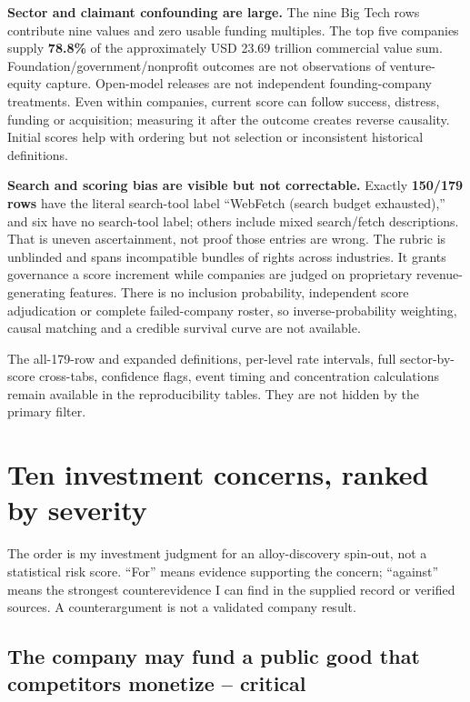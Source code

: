 \documentclass{article}
\begin{document}
\textbf{Sector and claimant confounding are large.} The nine Big Tech
rows contribute nine values and zero usable funding multiples. The top
five companies supply \textbf{78.8\%} of the approximately USD 23.69
trillion commercial value sum. Foundation/government/nonprofit outcomes
are not observations of venture-equity capture. Open-model releases are
not independent founding-company treatments. Even within companies,
current score can follow success, distress, funding or acquisition;
measuring it after the outcome creates reverse causality. Initial scores
help with ordering but not selection or inconsistent historical
definitions.

\textbf{Search and scoring bias are visible but not correctable.}
Exactly \textbf{150/179 rows} have the literal search-tool label
``WebFetch (search budget exhausted),'' and six have no search-tool
label; others include mixed search/fetch descriptions. That is uneven
ascertainment, not proof those entries are wrong. The rubric is
unblinded and spans incompatible bundles of rights across industries. It
grants governance a score increment while companies are judged on
proprietary revenue-generating features. There is no inclusion
probability, independent score adjudication or complete failed-company
roster, so inverse-probability weighting, causal matching and a credible
survival curve are not available.

The all-179-row and expanded definitions, per-level rate intervals, full
sector-by-score cross-tabs, confidence flags, event timing and
concentration calculations remain available in the reproducibility
tables. They are not hidden by the primary filter.

\section{Ten investment concerns, ranked by
severity}\label{ten-investment-concerns-ranked-by-severity}

The order is my investment judgment for an alloy-discovery spin-out, not
a statistical risk score. ``For'' means evidence supporting the concern;
``against'' means the strongest counterevidence I can find in the
supplied record or verified sources. A counterargument is not a
validated company result.

\subsection{The company may fund a public good that competitors monetize
--
critical}\label{the-company-may-fund-a-public-good-that-competitors-monetize-critical}
\end{document}
